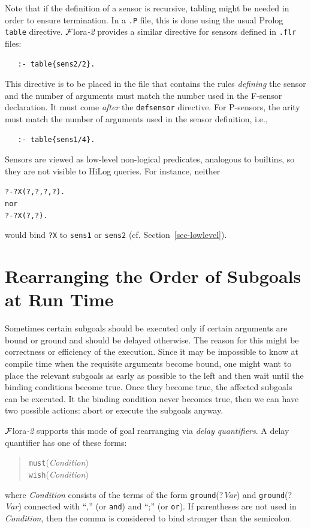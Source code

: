\documentclass[11pt]{article}
\newcommand{\FLORA}{{\mbox{\sc ${\cal F}${lora}\rm\emph{-2}}}\xspace}
\newcommand{\FLSYSTEM}{\FLORA}
\newcommand{\flrext}{flr\xspace}
\newcommand{\bs}{\textbackslash}
\begin{document}
Note that if the definition of a sensor is recursive, tabling might be
needed in order to ensure termination. In a \texttt{.P} file, this is done
using the usual Prolog \texttt{table} directive. \FLSYSTEM provides a similar
directive for sensors defined in \texttt{.\flrext} files:
\index{\bs{}table directive}
\begin{verbatim}
   :- table{sens2/2}.
\end{verbatim}
This directive is to be placed in the file that contains the rules \emph{defining}
the sensor and the number of arguments must match the number used in the
F-sensor declaration.
It must come \emph{after} the \texttt{defsensor} directive.  
For P-sensors, the arity must match the number of arguments used in the
sensor definition, i.e.,
\begin{verbatim}
   :- table{sens1/4}.
\end{verbatim}


Sensors are viewed as low-level non-logical predicates, analogous to
builtins, so
they are not visible to HiLog queries. For instance, neither
\begin{alltt}
   ?- ?X(?,?,?,?).
\textnormal{nor}
   ?- ?X(?,?).
\end{alltt}
would bind \texttt{?X}  to \texttt{sens1} or \texttt{sens2}
(cf. Section~\ref{sec-lowlevel}).

  
\section{Rearranging the Order of Subgoals at Run Time}
\label{sec-rearanging}

Sometimes certain subgoals should be executed only if certain arguments are
bound or ground and should be delayed otherwise.
The reason for this might be correctness or efficiency of the execution.
Since it may be impossible to know at compile time when the requisite
arguments become bound, one might want to place the relevant subgoals as
early as possible to the left and then wait until the binding conditions
become true. Once they become true, the affected subgoals can be
executed. It the binding condition never becomes true, then we can have two
possible actions: abort or execute the subgoals anyway.

\FLSYSTEM supports this mode of goal rearranging via \emph{delay quantifiers}.  
A delay quantifier has one of these forms:
\begin{quote}
  \texttt{must}(\emph{Condition})\\
  \texttt{wish}(\emph{Condition})  
\end{quote}
where \emph{Condition} consists of the terms of the form
\texttt{ground}(?\emph{Var}) and \texttt{ground}(?\emph{Var})
connected with ``,'' (or \texttt{and}) and ``;'' (or \texttt{or}).  
If parentheses are not used in \emph{Condition}, then the comma is
considered to bind stronger than the semicolon. 
\end{document}
